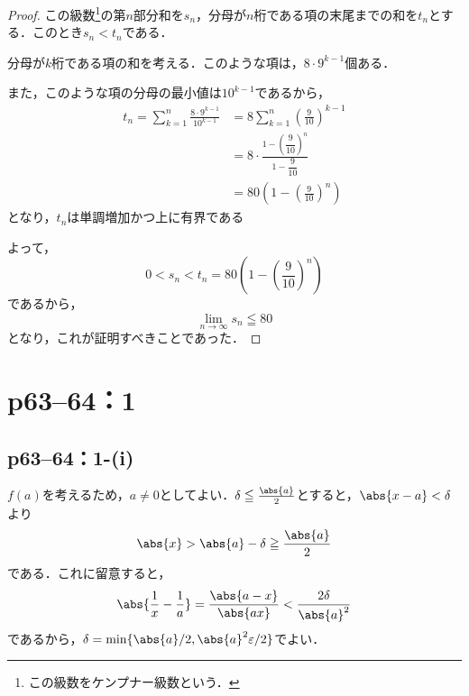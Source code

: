 \documentclass[a4paper,10pt,fleqn]{ltjsarticle}
\begin{document}
\begin{tleftbar}
    \begin{proof}
        この級数\footnote{この級数をケンプナー級数という．}の第$n$部分和を$s_n$，分母が$n$桁である項の末尾までの和を$t_n$とする．このとき$s_n < t_n$である．

        分母が$k$桁である項の和を考える．このような項は，$8 \cdot 9^{k-1}$個ある．

        また，このような項の分母の最小値は$10^{k-1}$であるから，
        \begin{align*}
            t_n = \sum_{k=1}^{n} \frac{8 \cdot 9^{k-1}}{10^{k-1}} & = 8 \sum_{k=1}^{n} \left(\frac{9}{10}\right)^{k-1}               \\
                                                                  & = 8 \cdot \frac{1-\left(\dfrac{9}{10}\right)^n}{1-\dfrac{9}{10}} \\
                                                                  & = 80 \left(1-\left(\frac{9}{10}\right)^n\right)
        \end{align*}
        となり，$t_n$は単調増加かつ上に有界である

        よって，
        \[
            0 < s_n < t_n = 80 \left(1-\left(\frac{9}{10}\right)^n\right)
        \]
        であるから，
        \[
            \lim_{n \to \infty} s_n \leqq 80
        \]
        となり，これが証明すべきことであった．
    \end{proof}
\end{tleftbar}


\newpage


\section*{p63--64：1}

\subsection*{p63--64：1-(i)}

\begin{tleftbar}
    $f(a)$を考えるため，$a \ne 0$としてよい．$\delta \le \frac{\abs{a}}{2}$とすると，$\abs{x-a}<\delta$より
    \[
        \abs{x} > \abs{a}-\delta \ge \frac{\abs{a}}{2}
    \]
    である．これに留意すると，
    \[
        \abs{\frac{1}{x}-\frac{1}{a}}=\frac{\abs{a-x}}{\abs{ax}} <\frac{2 \delta}{\abs{a}^2}
    \]
    であるから，$\delta = \min \{ \abs{a}/2,\abs{a}^2\varepsilon/2 \}$でよい．
\end{tleftbar}
\end{document}
